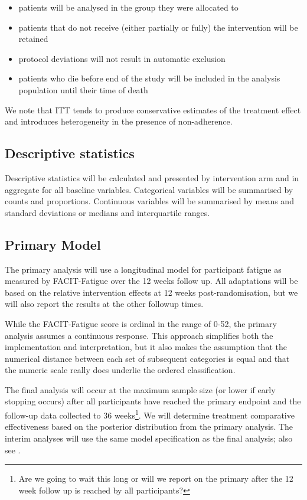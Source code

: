 \documentclass[
]{article}
\providecommand{\tightlist}{%
  \setlength{\itemsep}{0pt}\setlength{\parskip}{0pt}}
\begin{document}
\begin{itemize}
  \tightlist
  \item
        patients will be analysed in the group they were allocated to
  \item
        patients that do not receive (either partially or fully) the intervention will be retained
  \item
        protocol deviations will not result in automatic exclusion
  \item
        patients who die before end of the study  will be included in the analysis population until their time of death
\end{itemize}

We note that ITT tends to produce conservative estimates of the treatment effect and introduces heterogeneity in the presence of non-adherence.

\hypertarget{descriptive-statistics}{%
  \subsection{Descriptive statistics}\label{descriptive-statistics}}

Descriptive statistics will be calculated and presented by intervention arm and in aggregate for all baseline variables.
Categorical variables will be summarised by counts and proportions.
Continuous variables will be summarised by means and standard deviations or medians and interquartile ranges.

\hypertarget{primary-model}{%
  \subsection{Primary Model}\label{primary-model}}

The primary analysis will use a longitudinal model for participant fatigue as measured by FACIT-Fatigue over the 12 weeks follow up.
All adaptations will be based on the relative intervention effects at 12 weeks post-randomisation, but we will also report the results at the other followup times.

While the FACIT-Fatigue score is ordinal in the range of 0-52, the primary analysis assumes a continuous response.
This approach simplifies both the implementation and interpretation, but it also makes the assumption that the numerical distance between each set of subsequent categories is equal and that the numeric scale really does underlie the ordered classification.

The final analysis will occur at the maximum sample size (or lower if early stopping occurs) after all participants have reached the primary endpoint and the follow-up data collected to 36 weeks\footnote{Are we going to wait this long or will we report on the primary after the 12 week follow up is reached by all participants?}.
We will determine treatment comparative effectiveness based on the posterior distribution from the primary analysis.
The interim analyses will use the same model specification as the final analysis; also see .
\end{document}
